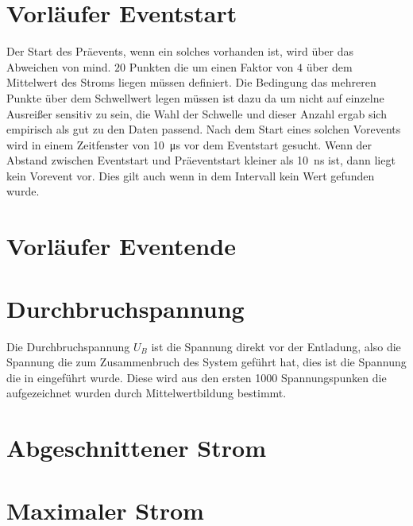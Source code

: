 \section{Vorläufer Eventstart}
\label{sec:preeventstart}

Der Start des Präevents, wenn ein solches vorhanden ist, wird über das Abweichen von mind. $20$ Punkten die um einen Faktor von $4$ über dem Mittelwert des Stroms liegen müssen definiert. Die Bedingung das mehreren Punkte über dem Schwellwert legen müssen ist dazu da um nicht auf einzelne Ausreißer sensitiv zu sein, die Wahl der Schwelle und dieser Anzahl ergab sich empirisch als gut zu den Daten passend. Nach dem Start eines solchen Vorevents wird in einem Zeitfenster von \SI{10}{\micro\second} vor dem Eventstart gesucht. Wenn der Abstand zwischen Eventstart und Präeventstart kleiner als \SI{10}{\nano\second} ist, dann liegt kein Vorevent vor. Dies gilt auch wenn in dem Intervall kein Wert gefunden wurde.

\section{Vorläufer Eventende}
\label{sec.preeventend}

\section{Durchbruchspannung}
\label{sec:breakdownvoltage}
Die Durchbruchspannung \(U_B\) ist die Spannung direkt vor der Entladung, also die Spannung die zum Zusammenbruch des System geführt hat, dies ist die Spannung die in  eingeführt wurde. Diese wird aus den ersten 1000 Spannungspunken die aufgezeichnet wurden durch Mittelwertbildung bestimmt. 

\section{Abgeschnittener Strom}
\label{sec:cutoffcurrent}

\section{Maximaler Strom}
\label{sec:maxcurrent}



